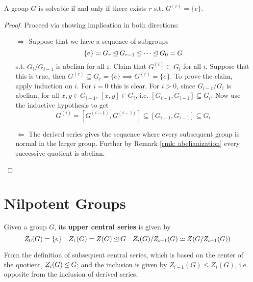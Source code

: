 \documentclass{article}
\begin{document}
\begin{proposition}\label{prop: group solvable iff derived series terminate}
    A group $G$ is solvable if and only if there exists $r$ s.t. $G^{(r)} = \{e\}$.
\end{proposition}

\begin{proof}
    Proceed via showing implication in both directions:
    \begin{enumerate}
        \item[$\Rightarrow$] Suppose that we have a sequence of subgroups
        \[
            \{e\} = G_r \unlhd G_{r-1} \unlhd \cdots \unlhd G_0 = G
        \]
        s.t. $G_i/G_{i-1}$ is abelian for all $i$. Claim that $G^{(i)} \subseteq G_i$ for all $i$. Suppose that this is true, then $G^{(r)} \subseteq G_r = \{e\} \implies G^{(r)} = \{e\}$. To prove the claim, apply induction on $i$. For $i = 0$ this is clear. For $i > 0$, since $G_{i-1}/G_i$ is abelian, for all $x, y \in G_{i-1}$, $[x, y] \in G_i$, i.e. $[G_{i-1}, G_{i-1}] \subseteq G_i$. Now use the inductive hypothesis to get
        \[
            G^{(i)} = [G^{(i-1)}, G^{(i-1)}] \subseteq [G_{i-1}, G_{i-1}] \subseteq G_i
        \]
        \item[$\Leftarrow$] The derived series gives the sequence where every subsequent group is normal in the larger group. Further by Remark \ref{rmk: abelianization} every successive quotient is abelian. 
    \end{enumerate}
\end{proof}

\clearpage
\section{Nilpotent Groups}

\begin{definition}
    Given a group $G$, its \textbf{upper central series} is given by
    \[
        Z_0(G) = \{e\} \quad Z_1(G) = Z(G) \unlhd G \quad Z_i(G)/Z_{i-1}(G) \simeq Z(G/Z_{i-1}(G)) 
    \]
\end{definition}

\begin{remark}
    From the definition of subsequent central series, which is based on the center of the quotient, $Z_i(G) \unlhd G$; and the inclusion is given by $Z_{i-1}(G) \leq Z_i(G)$, i.e. opposite from the inclusion of derived series.
\end{remark}
\end{document}
